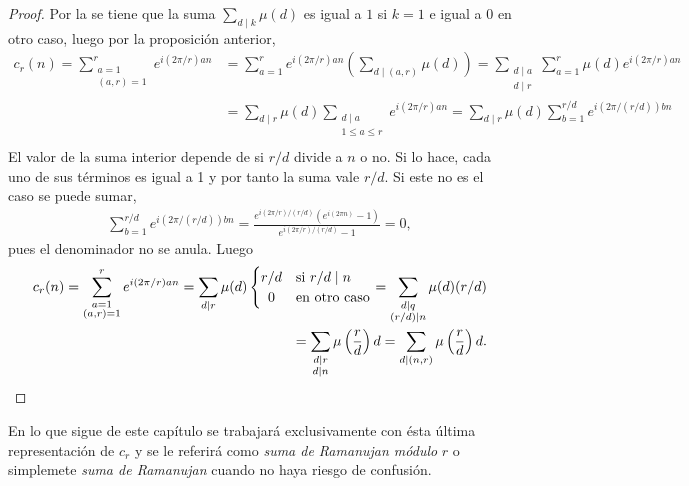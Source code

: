 \begin{proof}
Por la  se tiene que la suma $\sum_{d \mid k} \mu(d)$ es igual a $1$ si $k=1$ e igual a 0 en otro caso, luego por la proposición anterior,
\begin{align*}
    c_r(n) = \sum_{\substack{a=1 \\ (a,r)=1}}^{r} e^{i(2 \pi/r) a n} & = \sum_{a=1}^{r} e^{i(2 \pi / r) a n} \left( \sum_{d \mid (a,r)} \mu(d) \right) = \sum_{\substack{d \mid a \\ d \mid r}} \sum_{a=1}^{r}  \mu(d) e^{i(2 \pi / r) a n} \\
           & = \sum_{d \mid r} \mu(d) \sum_{\substack{d \mid a \\ 1 \le a \le r}} e^{i(2 \pi / r) a n} = \sum_{d \mid r} \mu(d) \sum_{b=1}^{r/d} e^{i (2 \pi / (r/d)) b n} \\
\end{align*}
El valor de la suma interior depende de si $r/d$ divide a $n$ o no. Si lo hace, cada uno de sus términos es igual a 1 y por tanto la suma vale $r/d$. Si este no es el caso se puede sumar,
\begin{align*}
    \sum_{b=1}^{r/d} e^{i (2 \pi / (r/d)) b n} = \frac{e^{i(2 \pi / r) / (r/d)} (e^{i(2 \pi n)} - 1)}{e^{i(2 \pi / r) / (r/d)} - 1} = 0,
\end{align*}
pues el denominador no se anula. Luego
\begin{align*}
    c_r (n) = \sum_{\substack{a=1 \\ (a,r)=1}}^{r} e^{i(2 \pi/r) a n} = \sum_{d \mid r} \mu(d) \begin{cases}
               \hfil r/d & \text{si } r/d \mid n \\
               \hfil 0 & \text{en otro caso}
           \end{cases} = \sum_{\substack{d \mid q \\ (r/d) \mid n}} \mu(d) (r/d) \\
           = \sum_{\substack{d \mid r \\ d \mid n}} \mu \left( \frac{r}{d} \right) d = \sum_{d \mid (n,r)} \mu \left( \frac{r}{d} \right) d.
\end{align*}
\end{proof}

En lo que sigue de este capítulo se trabajará exclusivamente con ésta última representación de $c_r$ y se le referirá como \emph{suma de Ramanujan módulo} $r$ o simplemete \emph{suma de Ramanujan} cuando no haya riesgo de confusión.

